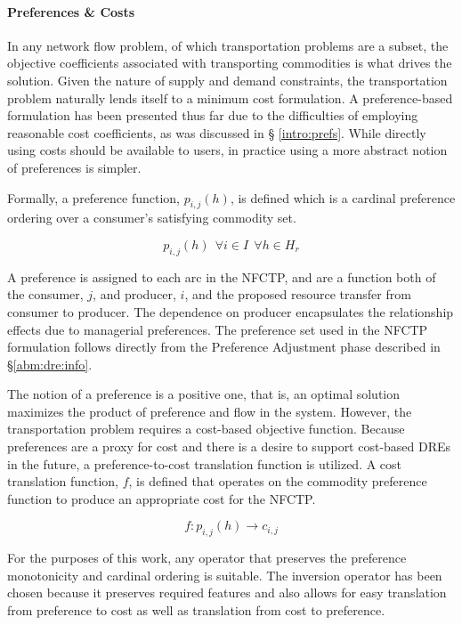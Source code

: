 \paragraph{Preferences \& Costs}

In any network flow problem, of which transportation problems are a subset, the
objective coefficients associated with transporting commodities is what drives
the solution. Given the nature of supply and demand constraints, the
transportation problem naturally lends itself to a minimum cost formulation. A
preference-based formulation has been presented thus far due to the difficulties
of employing reasonable cost coefficients, as was discussed in \S
\ref{intro:prefs}. While directly using costs should be available to users, in
practice using a more abstract notion of preferences is simpler.

Formally, a preference function, $p_{i, j}(h)$, is defined which is a cardinal
preference ordering over a consumer's satisfying commodity set.
 
\begin{equation}
p_{i, j}(h) \:\: \forall i \in I  \:\: \forall h \in H_{r} 
\end{equation}

\noindent
A preference is assigned to each arc in the NFCTP, and are a function both of
the consumer, $j$, and producer, $i$, and the proposed resource transfer from
consumer to producer. The dependence on producer encapsulates the relationship
effects due to managerial preferences. The preference set used in the NFCTP
formulation follows directly from the Preference Adjustment phase described in
\S \ref{abm:dre:info}.

The notion of a preference is a positive one, that is, an optimal solution
maximizes the product of preference and flow in the system. However, the
transportation problem requires a cost-based objective function. Because
preferences are a proxy for cost and there is a desire to support cost-based
DREs in the future, a preference-to-cost translation function is utilized. A
cost translation function, $f$, is defined that operates on the commodity
preference function to produce an appropriate cost for the NFCTP.

\begin{equation}
f : p_{i,j}(h) \to c_{i,j}
\end{equation}

\noindent
For the purposes of this work, any operator that preserves the preference
monotonicity and cardinal ordering is suitable.  The inversion operator has been
chosen because it preserves required features and also allows for easy
translation from preference to cost as well as translation from cost to
preference.


